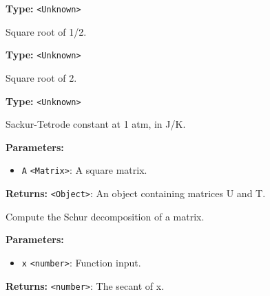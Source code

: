 \documentclass[12pt,a4paper]{article}
\begin{document}
\vspace{5mm}
\noindent {}\vspace{4mm}


\noindent \textbf{Type:} \texttt{<Unknown>}

\noindent Square root of 1/2.

\vspace{5mm}
\noindent {}\vspace{4mm}


\noindent \textbf{Type:} \texttt{<Unknown>}

\noindent Square root of 2.

\vspace{5mm}
\noindent {}\vspace{4mm}


\noindent \textbf{Type:} \texttt{<Unknown>}

\noindent Sackur-Tetrode constant at 1 atm, in J/K.

\vspace{5mm}
\noindent {}


\noindent \textbf{Parameters:}
\begin{itemize}
  \item \texttt{A} \texttt{<Matrix>}: A square matrix.
\end{itemize}

\noindent \textbf{Returns:} \texttt{<Object>}: An object containing matrices U and T.

\noindent Compute the Schur decomposition of a matrix.

\vspace{5mm}
\noindent {}


\noindent \textbf{Parameters:}
\begin{itemize}
  \item \texttt{x} \texttt{<number>}: Function input.
\end{itemize}

\noindent \textbf{Returns:} \texttt{<number>}: The secant of x.
\end{document}
